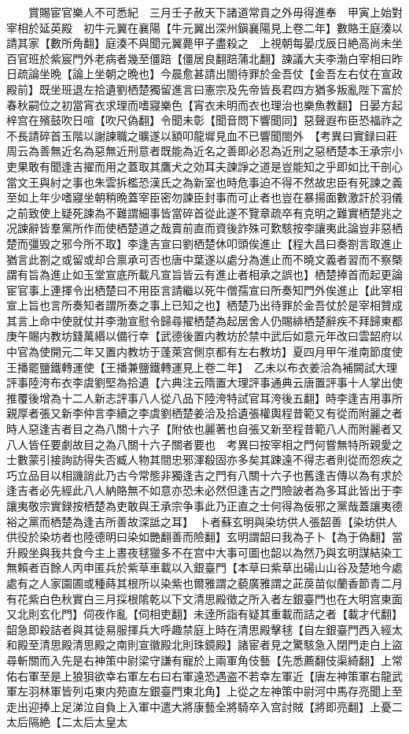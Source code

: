 　　賞賜宦官樂人不可悉紀　三月壬子赦天下諸道常貢之外毋得進奉　甲寅上始對宰相於延英殿　初牛元翼在襄陽【牛元翼出深州鎭襄陽見上卷二年】數賂王庭湊以請其家【數所角翻】庭湊不與聞元翼薨甲子盡殺之　上視朝每晏戊辰日絶高尚未坐百官班於紫宸門外老病者幾至僵踣【僵居良翻踣蒲北翻】諫議大夫李渤白宰相曰昨日疏論坐晩【論上坐朝之晩也】今晨愈甚請出閤待罪於金吾仗【金吾左右仗在宣政殿前】既坐班退左拾遺劉栖楚獨留進言曰憲宗及先帝皆長君四方猶多叛亂陛下富於春秋嗣位之初當宵衣求理而嗜寢樂色【宵衣未明而衣也理治也樂魚教翻】日晏方起梓宫在殯鼓吹日喧【吹尺偽翻】令聞未彰【聞音問下響聞同】惡聲遐布臣恐福祚之不長請碎首玉階以謝諫職之曠遂以額叩龍墀見血不已響聞閤外　【考異曰實録曰莊周云為善無近名為惡無近刑意者既能為近名之善即必忍為近刑之惡栖楚本王承宗小吏果敢有聞逢吉擢而用之蓋取其鷹犬之効耳夫諫諍之道是豈能知之乎即如比干剖心當文王與紂之事也朱雲拆檻恐漢氏之為新室也時危事迫不得不然故忠臣有死諫之義至如上年少嗜寢坐朝稍晩蓋宰臣密勿諫臣封事而可止者也豈在暴揚面數激訐於羽儀之前致使上疑死諫為不難謂細事皆當碎首從此遂不覽章疏卒有克明之難實栖楚兆之况諫辭皆羣黨所作而使栖楚道之哉賣前直而資後詐殊可歎駭按李讓夷此論豈非惡栖楚而彊毁之邪今所不取】李逢吉宣曰劉栖楚休叩頭俟進止【程大昌曰奏劄言取進止猶言此劄之或留或却合禀承可否也唐中葉遂以處分為進止而不曉文義者習而不察槩謂有旨為進止如玉堂宣底所載凡宣旨皆云有進止者相承之誤也】栖楚捧首而起更論宦官事上連揮令出栖楚曰不用臣言請繼以死牛僧孺宣曰所奏知門外俟進止【此宰相宣上旨也言所奏知者謂所奏之事上已知之也】栖楚乃出待罪於金吾仗於是宰相贊成其言上命中使就仗并李渤宣慰令歸尋擢栖楚為起居舍人仍賜緋栖楚辭疾不拜歸東都　庚午賜内教坊錢萬緡以備行幸【武德後置内教坊於禁中武后如意元年改曰雲韶府以中官為使開元二年又置内教坊于蓬萊宫側京都有左右教坊】夏四月甲午淮南節度使王播罷鹽鐵轉運使【王播兼鹽鐵轉運見上卷二年】　乙未以布衣姜洽為補闕試大理評事陸洿布衣李虞劉堅為拾遺【六典注云隋置大理評事通典云唐置評事十人掌出使推覆後增為十二人新志評事八人從八品下陸洿特試官耳洿後五翻】時李逢吉用事所親厚者張又新李仲言李續之李虞劉栖楚姜洽及拾遺張權輿程昔範又有從而附麗之者時人惡逢吉者目之為八關十六子【附依也麗著也自張又新至程昔範八人而附麗者又八人皆任要劇故目之為八關十六子關者要也　考異曰按宰相之門何嘗無特所親愛之士數蒙引接詢訪得失否臧人物其間忠邪渾殽固亦多矣其踈遠不得志者則從而怨疾之巧立品目以相譏誚此乃古今常態非獨逢吉之門有八關十六子也舊逢吉傳以為有求於逢吉者必先經此八人納賂無不如意亦恐未必然但逢吉之門險詖者為多耳此皆出于李讓夷敬宗實録按栖楚為吏敢與王承宗争事此乃正直之士何得為佞邪之黨哉蓋讓夷德裕之黨而栖楚為逢吉所善故深詆之耳】　卜者蘇玄明與染坊供人張韶善【染坊供人供役於染坊者也陸德明曰染如艷翻善而險翻】玄明謂韶曰我為子卜【為于偽翻】當升殿坐與我共食今主上晝夜毬獵多不在宫中大事可圖也韶以為然乃與玄明謀結染工無賴者百餘人丙申匿兵於紫草車載以入銀臺門【本草曰紫草出碭山山谷及楚地今處處有之人家園圃或種蒔其根所以染紫也爾雅謂之藐廣雅謂之茈䓞苗似蘭香節青二月有花紫白色秋實白三月採根隂乾以下文清思殿徵之所入者左銀臺門也在大明宫東面又北則玄化門】伺夜作亂【伺相吏翻】未逹所詣有疑其重載而詰之者【載才代翻】韶急即殺詰者與其徒易服揮兵大呼趣禁庭上時在清思殿擊毬【自左銀臺門西入經太和殿至清思殿清思殿之南則宣徽殿北則珠鏡殿】諸宦者見之驚駭急入閉門走白上盜尋斬關而入先是右神策中尉梁守謙有寵於上兩軍角伎藝【先悉薦翻伎渠綺翻】上常佑右軍至是上狼狽欲幸右軍左右曰右軍遠恐遇盗不若幸左軍近【唐左神策軍右龍武軍左羽林軍皆列屯東内苑直左銀臺門東北角】上從之左神策中尉河中馬存亮聞上至走出迎捧上足涕泣自負上入軍中遣大將康藝全將騎卒入宫討賊【將即亮翻】上憂二太后隔絶【二太后太皇太